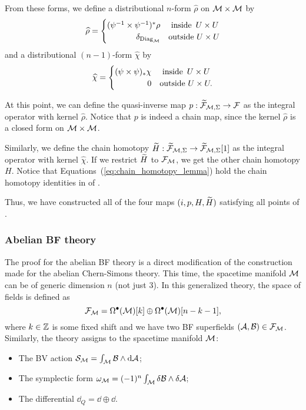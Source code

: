 From these forms, we define a distributional $n$-form $\hat{\rho}$ on $\mathcal{M} \times \mathcal{M}$ by
\begin{equation*}
    \hat{\rho} = 
        \begin{cases}
            (\psi^{-1} \times \psi^{-1})^* \rho & \text{ inside } \,  U \times U \\
             \hfill \delta_{\diag_\M}           &\text{outside } U \times U
        \end{cases}
\end{equation*}
and a distributional $(n-1)$-form $\hat{\chi}$ by
\begin{equation*}
    \hat{\chi} = 
        \begin{cases}
            (\psi \times \psi)_* \chi & \text{ inside } \,  U \times U \\
             \hfill 0                 &\text{outside } U \times U .
        \end{cases}
\end{equation*}

At this point, we can define the quasi-inverse map $p: \widetilde{\mathcal{F}}_{\mathcal{M}, \Sigma} \rightarrow \mathcal{F}$ as the integral operator with kernel $\hat{\rho}$.
Notice that $p$ is indeed a chain map, since the kernel $\hat{\rho}$ is a closed form on $\mathcal{M} \times \mathcal{M}$.

Similarly, we define the chain homotopy $\widetilde{H} : \widetilde{\mathcal{F}}_{\mathcal{M}, \Sigma} \rightarrow \widetilde{\mathcal{F}}_{\mathcal{M}, \Sigma}[1]$ as the integral operator with kernel $\hat{\chi}$.
If we restrict $\widetilde{H}$ to $\mathcal{F}_{\mathcal{M}}$, we get the other chain homotopy $H$.
Notice that Equations~(\ref{eq:chain_homotopy_lemma}) hold the chain homotopy identities in  of .

Thus, we have constructed all of the four maps $(i, p, H, \widetilde{H})$ satisfying all points of .

\subsubsection{Abelian BF theory}
\label{subsubsec:abelain_bf_theory}

The proof for the abelian BF theory is a direct modification of the construction made for the abelian Chern-Simons theory.
This time, the spacetime manifold $\mathcal{M}$ can be of generic dimension $n$ (not just 3).
In this generalized theory, the space of fields is defined as
\begin{equation*}
    \mathcal{F}_{\mathcal{M}} = 
    \Omega^\bullet (\mathcal{M})[k] \oplus
    \Omega^\bullet (\mathcal{M})[n-k-1],
\end{equation*}
where $k \in \mathbb{Z}$ is some fixed shift and we have two BF superfields $(\mathcal{A}, \mathcal{B}) \in \mathcal{F}_{\mathcal{M}}$.
Similarly, the theory assigns to the spacetime manifold $\mathcal{M}$:
\begin{itemize}
    \item The BV action $\mathcal{S}_{\mathcal{M}} = \int_{\mathcal{M}} \mathcal{B} \wedge \dd \mathcal{A}$;
    \item The symplectic form $\omega_{\mathcal{M}} = (-1)^n  \int_{\mathcal{M}} \delta \mathcal{B} \wedge \delta \mathcal{A}$;
    \item The differential $\dd_Q = \dd \oplus \dd$.
\end{itemize}

